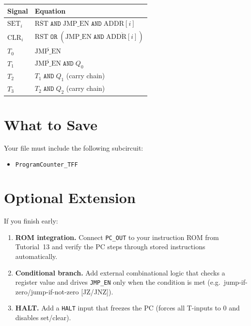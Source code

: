 \documentclass[11pt,a4paper]{article}
\newcommand{\signal}[1]{\texttt{#1}}
\begin{document}
\begin{center}
\renewcommand{\arraystretch}{1.4}
\begin{tabular}{ll}
  \toprule
  \textbf{Signal} & \textbf{Equation} \\
  \midrule
  $\text{SET}_i$ & $\overline{\text{RST}} \;\texttt{AND}\; \text{JMP\_EN}
                     \;\texttt{AND}\; \text{ADDR}[i]$ \\
  $\text{CLR}_i$ & $\text{RST} \;\texttt{OR}\; (\text{JMP\_EN}
                     \;\texttt{AND}\; \overline{\text{ADDR}[i]})$ \\
  $T_0$          & $\overline{\text{JMP\_EN}}$ \\
  $T_1$          & $\overline{\text{JMP\_EN}} \;\texttt{AND}\; Q_0$ \\
  $T_2$          & $T_1 \;\texttt{AND}\; Q_1$ \quad (carry chain) \\
  $T_3$          & $T_2 \;\texttt{AND}\; Q_2$ \quad (carry chain) \\
  \bottomrule
\end{tabular}
\end{center}

\section{What to Save}

Your file must include the following subcircuit:
\begin{itemize}
  \item \signal{ProgramCounter\_TFF}
\end{itemize}

\section{Optional Extension}

If you finish early:
\begin{enumerate}[leftmargin=2em]
  \item \textbf{ROM integration.} Connect \signal{PC\_OUT} to your instruction
        ROM from Tutorial~13 and verify the PC steps through stored instructions
        automatically.
  \item \textbf{Conditional branch.} Add external combinational logic that
        checks a register value and drives \signal{JMP\_EN} only when the
        condition is met (e.g.\ jump-if-zero/jump-if-not-zero [JZ/JNZ]).
  \item \textbf{HALT.} Add a \signal{HALT} input that freezes the PC
        (forces all T-inputs to 0 and disables set/clear).
\end{enumerate}
\end{document}
